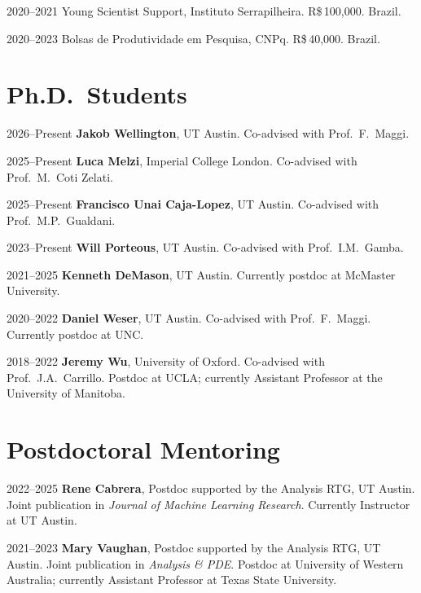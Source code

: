 \documentclass[11pt]{article}
\newcommand{\entry}[2]{%
  \par\addvspace{0.6ex}\noindent
  \begin{list}{}{%
    \setlength{\leftmargin}{1.5in}%
    \setlength{\labelwidth}{1.4in}%
    \setlength{\labelsep}{0.1in}%
  }%
  \item[\textsf{\small #1}] #2
  \end{list}
}
\begin{document}
\entry{2020--2021}{Young Scientist Support, Instituto Serrapilheira. R\$\,100{,}000. Brazil.}

\entry{2020--2023}{Bolsas de Produtividade em Pesquisa, CNPq. R\$\,40{,}000. Brazil.}

\section{Ph.D.\ Students}

\entry{2026--Present}{\textbf{Jakob Wellington}, UT Austin. Co-advised with Prof.\ F.\ Maggi.}

\entry{2025--Present}{\textbf{Luca Melzi}, Imperial College London. Co-advised with Prof.\ M.\ Coti Zelati.}

\entry{2025--Present}{\textbf{Francisco Unai Caja-Lopez}, UT Austin. Co-advised with Prof.\ M.P.\ Gualdani.}

\entry{2023--Present}{\textbf{Will Porteous}, UT Austin. Co-advised with Prof.\ I.M.\ Gamba.}

\entry{2021--2025}{\textbf{Kenneth DeMason}, UT Austin. Currently postdoc at McMaster University.}

\entry{2020--2022}{\textbf{Daniel Weser}, UT Austin. Co-advised with Prof.\ F.\ Maggi. Currently postdoc at UNC.}

\entry{2018--2022}{\textbf{Jeremy Wu}, University of Oxford. Co-advised with Prof.\ J.A.\ Carrillo. Postdoc at UCLA; currently Assistant Professor at the University of Manitoba.}

\section{Postdoctoral Mentoring}

\entry{2022--2025}{\textbf{Rene Cabrera}, Postdoc supported by the Analysis RTG, UT Austin. Joint publication in \emph{Journal of Machine Learning Research}. Currently Instructor at UT Austin.}

\entry{2021--2023}{\textbf{Mary Vaughan}, Postdoc supported by the Analysis RTG, UT Austin. Joint publication in \emph{Analysis \& PDE}. Postdoc at University of Western Australia; currently Assistant Professor at Texas State University.}
\end{document}
